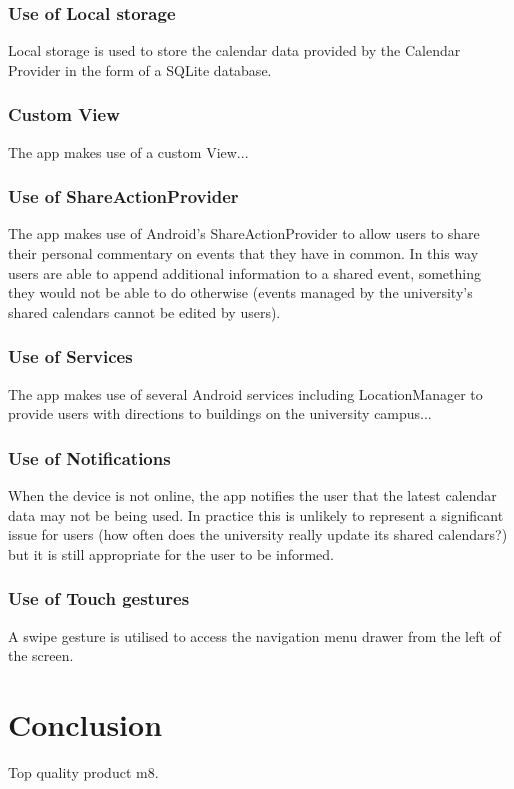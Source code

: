 \documentclass{article}
\begin{document}
\subsubsection{Use of Local storage}
Local storage is used to store the calendar data provided by the Calendar Provider in the form of a SQLite database.
\subsubsection{Custom View}
The app makes use of a custom View...
\subsubsection{Use of ShareActionProvider}
The app makes use of Android's ShareActionProvider to allow users to share their personal commentary on events that they have in common. In this way users are able to append additional information to a shared event, something they would not be able to do otherwise (events managed by the university's shared calendars cannot be edited by users).
\subsubsection{Use of Services}
The app makes use of several Android services including LocationManager to provide users with directions to buildings on the university campus... 
\subsubsection{Use of Notifications}
When the device is not online, the app notifies the user that the latest calendar data may not be being used. In practice this is unlikely to represent a significant issue for users (how often does the university really update its shared calendars?) but it is still appropriate for the user to be informed.
\subsubsection{Use of Touch gestures}
A swipe gesture is utilised to access the navigation menu drawer from the left of the screen.

\section{Conclusion}
Top quality product m8.
\end{document}
